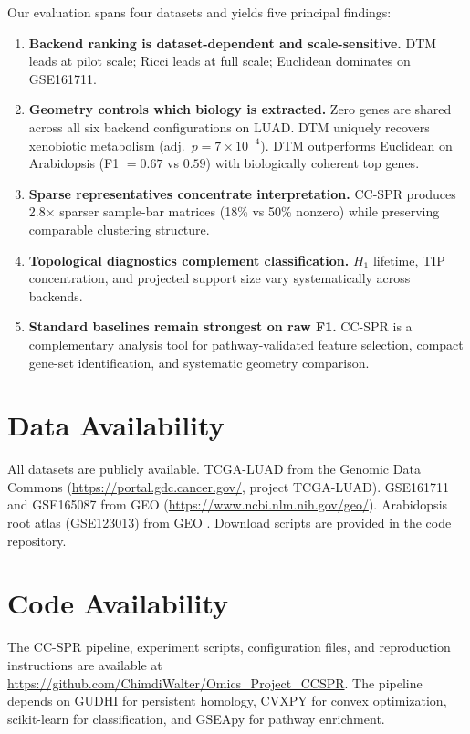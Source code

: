 \documentclass[12pt]{article}
\begin{document}
Our evaluation spans four datasets and yields five principal findings:
\begin{enumerate}[leftmargin=1.5em]
\item \textbf{Backend ranking is dataset-dependent and scale-sensitive.}
DTM leads at pilot scale; Ricci leads at full scale; Euclidean dominates on GSE161711.
\item \textbf{Geometry controls which biology is extracted.}
Zero genes are shared across all six backend configurations on LUAD.
DTM uniquely recovers xenobiotic metabolism (adj.\ $p = 7 \times 10^{-4}$).
DTM outperforms Euclidean on Arabidopsis (F1 $= 0.67$ vs $0.59$) with biologically coherent top genes.
\item \textbf{Sparse representatives concentrate interpretation.}
CC-SPR produces 2.8$\times$ sparser sample-bar matrices (18\% vs 50\% nonzero) while preserving comparable clustering structure.
\item \textbf{Topological diagnostics complement classification.}
$H_1$ lifetime, TIP concentration, and projected support size vary systematically across backends.
\item \textbf{Standard baselines remain strongest on raw F1.}
CC-SPR is a complementary analysis tool for pathway-validated feature selection, compact gene-set identification, and systematic geometry comparison.
\end{enumerate}


\section*{Data Availability}
All datasets are publicly available.
TCGA-LUAD from the Genomic Data Commons (\url{https://portal.gdc.cancer.gov/}, project TCGA-LUAD).
GSE161711 and GSE165087 from GEO (\url{https://www.ncbi.nlm.nih.gov/geo/}).
Arabidopsis root atlas (GSE123013) from GEO \cite{denyer2019}.
Download scripts are provided in the code repository.

\section*{Code Availability}
The CC-SPR pipeline, experiment scripts, configuration files, and reproduction instructions are available at \url{https://github.com/ChimdiWalter/Omics_Project_CCSPR}.
The pipeline depends on GUDHI \cite{gudhi2014} for persistent homology, CVXPY for convex optimization, scikit-learn for classification, and GSEApy \cite{gseapy} for pathway enrichment.
\end{document}
